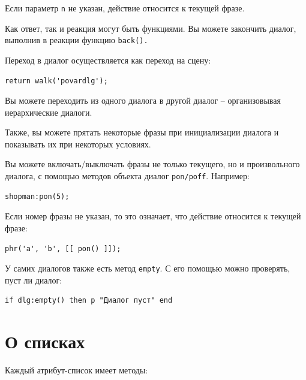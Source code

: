 \documentclass[12pt]{article}
\begin{document}
Если параметр \verb/n/ не указан, действие относится к текущей фразе.

Как ответ, так и реакция могут быть функциями. Вы можете закончить диалог, выполнив в реакции функцию \verb/back()./

Переход в диалог осуществляется как переход на сцену:

\begin{verbatim}
return walk('povardlg');
\end{verbatim}

Вы можете переходить из одного диалога в другой диалог -- организовывая иерархические диалоги.

Также, вы можете прятать некоторые фразы при инициализации диалога и показывать их при некоторых условиях.

Вы можете включать/выключать фразы не только текущего, но и произвольного диалога, с помощью методов объекта диалог \verb,pon/poff,. Например:

\begin{verbatim}
shopman:pon(5);
\end{verbatim}

Если номер фразы не указан, то это означает, что действие относится к текущей фразе:

\begin{verbatim}
phr('a', 'b', [[ pon() ]]);
\end{verbatim}

У самих диалогов также есть метод \verb/empty/. С его помощью можно проверять, пуст ли диалог:

\begin{verbatim}
if dlg:empty() then p "Диалог пуст" end
\end{verbatim}

\section{О списках}

Каждый атрибут-список имеет методы:
\end{document}
